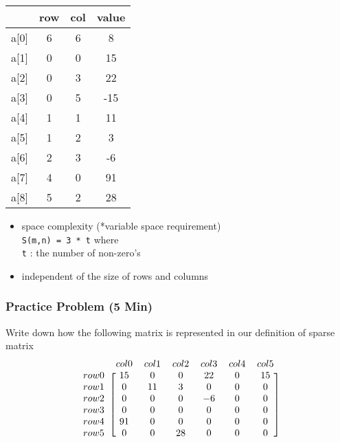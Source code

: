 \documentclass[newPxFont,sthlmFooter,nooffset]{beamer}
\begin{document}
\begin{frame}
  \begin{center}
    \begin{tabular}{r c c c}
      & row & col & value \\ \hline
      a[0]&  6  &  6  &   8   \\
      a[1]&  0  &  0  &  15   \\ 
      a[2]&  0  &  3  &  22   \\ 
      a[3]&  0  &  5  & -15   \\ 
      a[4]&  1  &  1  &  11   \\ 
      a[5]&  1  &  2  &   3   \\ 
      a[6]&  2  &  3  &  -6   \\ 
      a[7]&  4  &  0  &  91   \\ 
      a[8]&  5  &  2  &  28   \\ 
    \end{tabular}
  \end{center}
  \begin{itemize}
  \item space complexity (*variable space requirement) \\
\texttt{S(m,n) = 3 * t} where \\
\texttt{t} : the number of non-zero’s
\item independent of the size of rows and columns
  \end{itemize}

\end{frame}

\begin{frame}[t]
	\frametitle{Practice Problem (5 Min)}
Write down how the following matrix is represented in our definition of sparse matrix
\begin{equation*}
  \begin{blockarray}{r *{6}{c}}
      & col0 & col1 & col2 & col3 & col4 & col5 \\
\begin{block}{l [*{6}{c}]}
 row0 & 15  & 0   & 0  &  22 &   0 &   15   \\
 row1 & 0   & 11  & 3  &   0 &   0 &   0   \\
 row2 & 0   & 0   & 0  &  -6 &   0 &   0   \\
 row3 & 0   & 0   & 0  &   0 &   0 &   0   \\
 row4 & 91  & 0   & 0  &   0 &   0 &   0   \\
 row5 & 0   & 0   & 28 &   0 &   0 &   0   \\
\end{block}
  \end{blockarray}
\end{equation*}

\end{frame}
\end{document}
